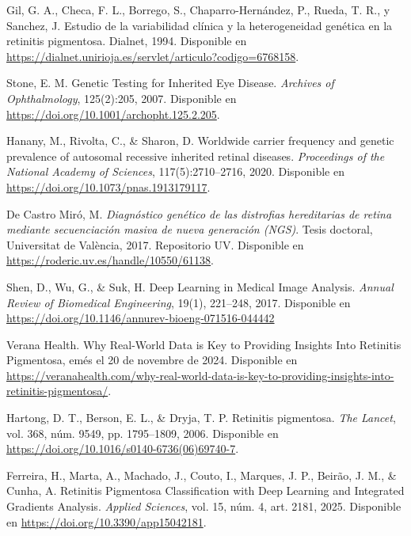 \documentclass[11pt,spanish,listoffigures,listoftables]{tfgetsinf}
\begin{document}
\begin{thebibliography}{99}
   Gil, G. A., Checa, F. L., Borrego, S., Chaparro-Hernández, P., Rueda, T. R., y Sanchez, J.  
   \newblock Estudio de la variabilidad clínica y la heterogeneidad genética en la retinitis pigmentosa.  
   \newblock Dialnet, 1994.    
   \newblock Disponible en  
   \url{https://dialnet.unirioja.es/servlet/articulo?codigo=6768158}.

   Stone, E. M.  
   \newblock Genetic Testing for Inherited Eye Disease.  
   \newblock \textit{Archives of Ophthalmology}, 125(2):205, 2007.  
   \newblock Disponible en
   \newblock \url{https://doi.org/10.1001/archopht.125.2.205}.

   Hanany, M., Rivolta, C., \& Sharon, D.  
   \newblock Worldwide carrier frequency and genetic prevalence of autosomal recessive inherited retinal diseases.  
   \newblock \textit{Proceedings of the National Academy of Sciences}, 117(5):2710–2716, 2020.  
   \newblock Disponible en
   \newblock \url{https://doi.org/10.1073/pnas.1913179117}.

   De Castro Miró, M.  
   \newblock \textit{Diagnóstico genético de las distrofias hereditarias de retina mediante secuenciación masiva de nueva generación (NGS)}.  
   \newblock Tesis doctoral, Universitat de València, 2017.  
   \newblock Repositorio UV.  
   \newblock Disponible en
   \newblock \url{https://roderic.uv.es/handle/10550/61138}.

   Shen, D., Wu, G., \& Suk, H.
   \newblock Deep Learning in Medical Image Analysis.
   \newblock \textit{Annual Review of Biomedical Engineering}, 19(1), 221--248, 2017.
   \newblock Disponible en
   \newblock \url{https://doi.org/10.1146/annurev-bioeng-071516-044442}

   Verana Health.  
   \newblock Why Real-World Data is Key to Providing Insights Into Retinitis Pigmentosa,  
   emés el 20 de novembre de 2024.  
   \newblock Disponible en  
   \url{https://veranahealth.com/why-real-world-data-is-key-to-providing-insights-into-retinitis-pigmentosa/}.

   Hartong, D. T., Berson, E. L., \& Dryja, T. P.  
   \newblock Retinitis pigmentosa.  
   \newblock \textit{The Lancet}, vol. 368, núm. 9549, pp. 1795--1809, 2006.  
   \newblock Disponible en  
   \url{https://doi.org/10.1016/s0140-6736(06)69740-7}.

   Ferreira, H., Marta, A., Machado, J., Couto, I., Marques, J. P., Beirão, J. M., \& Cunha, A.  
   \newblock Retinitis Pigmentosa Classification with Deep Learning and Integrated Gradients Analysis.  
   \newblock \textit{Applied Sciences}, vol. 15, núm. 4, art. 2181, 2025.  
   \newblock Disponible en  
   \url{https://doi.org/10.3390/app15042181}.


\end{thebibliography}
\end{document}
